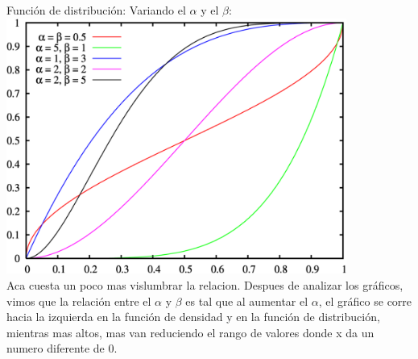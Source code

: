 \begin{itemize}
	Funci\'on de distribuci\'on: Variando el $\alpha$ y el $\beta$:\\
  	  \includegraphics[height=3.3in]{images/distribucion_pbeta.png}\\
	Aca cuesta un poco mas vislumbrar la relacion. Despues de analizar los gr\'aficos, vimos que la relaci\'on entre el $\alpha$ y $\beta$ es tal que al aumentar el $\alpha$, el gr\'afico se corre hacia la izquierda en la funci\'on de densidad y en la funci\'on de distribuci\'on, mientras mas altos, mas van reduciendo el rango de valores donde x da un numero diferente de 0.

\end{itemize}

